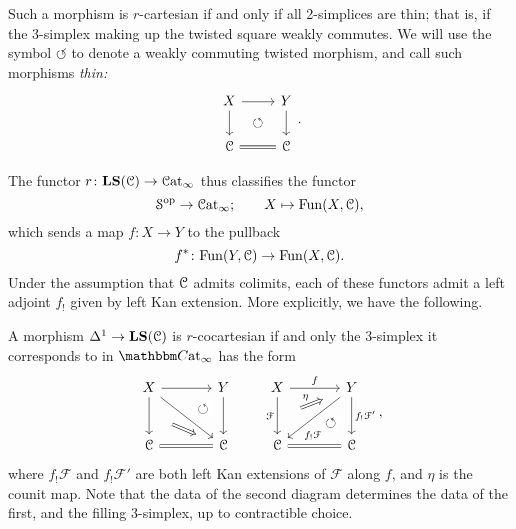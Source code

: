 \documentclass[main.tex]{subfiles}
\begin{document}
Such a morphism is $r$-cartesian if and only if all 2-simplices are thin; that is, if the 3-simplex making up the twisted square weakly commutes. We will use the symbol $\circlearrowleft$ to denote a weakly commuting twisted morphism, and call such morphisms \emph{thin:}
\begin{equation*}
  \begin{tikzcd}
    X
    \arrow[r]
    \arrow[d, ""{name=L, right}]
    & Y
    \arrow[d, ""{name=R, left}]
    \\
    \category{C}
    & \category{C}
    \arrow[l, equals]
    \arrow[Rightarrow, from=L, to=R, shorten=1.5ex, phantom, "\circlearrowleft"]
  \end{tikzcd}.
\end{equation*}

The functor $r\colon \mathbf{LS}(\mathcal{C}) \to \mathcal{C}\mathrm{at}_{\infty}$ thus classifies the functor
\begin{equation*}
  \mathcal{S}^{\mathrm{op}} \to \mathcal{C}\mathrm{at}_{\infty};\qquad X \mapsto \mathrm{Fun}(X, \mathcal{C}),
\end{equation*}
which sends a map $f\colon X \to Y$ to the pullback
\begin{equation*}
  f^{*}\colon \mathrm{Fun}(Y, \mathcal{C}) \to \mathrm{Fun}(X, \mathcal{C}).
\end{equation*}
Under the assumption that $\mathcal{C}$ admits colimits, each of these functors admit a left adjoint $f_{!}$ given by left Kan extension. More explicitly, we have the following.
\begin{proposition}
  A morphism $\Delta^{1} \to \mathbf{LS}(\mathcal{C})$ is $r$-cocartesian if and only the 3-simplex it corresponds to in $\ICCat$ has the form
  \begin{equation*}
    \begin{tikzcd}[column sep=large, row sep=large]
      X
      \arrow[r]
      \arrow[d, ""{name=L, right}]
      \arrow[dr]
      & Y
      \arrow[d, ""{name=R, left}]
      \arrow[from=l, to=R, phantom, near end, "\circlearrowleft"{description}]
      \\
      \category{C}
      & \category{C}
      \arrow[l, equals]
      \arrow[from=L, Rightarrow, shorten=3ex]
    \end{tikzcd}
    \qquad
    \begin{tikzcd}[column sep=large, row sep=large]
      X
      \arrow[r, "f"]
      \arrow[d, "\mathcal{F}"{swap}, ""{name=L, right}]
      & Y
      \arrow[d, ""{name=R, left}, "f_{!}\mathcal{F}'"]
      \arrow[dl, near end, "f_{!}\mathcal{F}"]
      \\
      \category{C}
      \arrow[from=R, phantom, near start, "\circlearrowleft"{description}]
      & \category{C}
      \arrow[l, equals]
      \arrow[from=L, to=u, shorten=3ex, Rightarrow, "\eta"]
    \end{tikzcd},
  \end{equation*}
  where $f_{!}\mathcal{F}$ and $f_{!}\mathcal{F}'$ are both left Kan extensions of $\mathcal{F}$ along $f$, and $\eta$ is the counit map. Note that the data of the second diagram determines the data of the first, and the filling 3-simplex, up to contractible choice.
\end{proposition}
\end{document}
